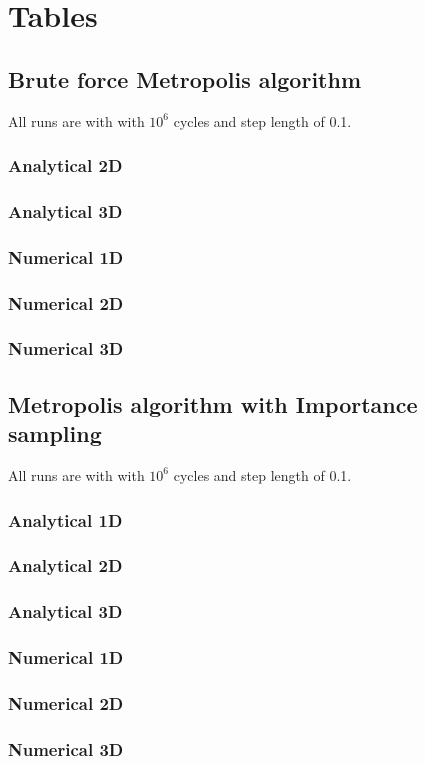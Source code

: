 \section{Tables}
\subsection{Brute force Metropolis algorithm}
All runs are with with $10^6$ cycles and step length
of 0.1.
%
\subsubsection{Analytical 2D}

\subsubsection{Analytical 3D}

\newpage
\subsubsection{Numerical 1D}

\subsubsection{Numerical 2D}

\subsubsection{Numerical 3D}

\newpage
\subsection{Metropolis algorithm with Importance sampling}
All runs are with with $10^6$ cycles and step length
of 0.1.
\subsubsection{Analytical 1D}

\subsubsection{Analytical 2D}

\subsubsection{Analytical 3D}

\newpage
\subsubsection{Numerical 1D}

\subsubsection{Numerical 2D}

\subsubsection{Numerical 3D}

